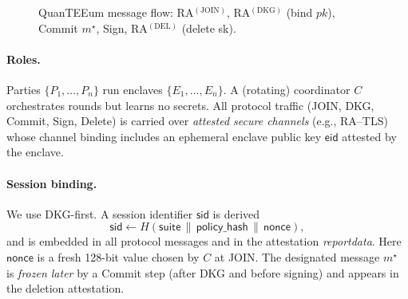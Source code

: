\documentclass[runningheads,orivec]{llncs}
\newcommand{\RA}{\mathsf{RA}}
\begin{document}
\begin{figure}[!htbp]
\caption{QuanTEEum message flow: RA$^{(\mathrm{JOIN})}$, RA$^{(\mathrm{DKG})}$ (bind $pk$), Commit $m^{\star}$, Sign, RA$^{(\mathrm{DEL})}$ (delete sk).}
\label{fig:flow}
\end{figure}

\paragraph{Roles.}
Parties $\{P_1,\dots,P_n\}$ run enclaves $\{E_1,\dots,E_n\}$.
A (rotating) coordinator $C$ orchestrates rounds but learns no secrets.
All protocol traffic (JOIN, DKG, Commit, Sign, Delete) is carried over
\emph{attested secure channels} (e.g., RA--TLS) whose channel binding includes an
ephemeral enclave public key $\mathsf{eid}$ attested by the enclave.

\paragraph{Session binding.}
We use DKG-first. A session identifier $\mathsf{sid}$ is derived
\[
  \mathsf{sid} \gets H(\mathsf{suite}\,\|\,\mathsf{policy\_hash}\,\|\,\mathsf{nonce}),
\]
and is embedded in all protocol messages and in the attestation \emph{reportdata}.
Here $\mathsf{nonce}$ is a fresh 128-bit value chosen by $C$ at JOIN.
The designated message $m^{\star}$ is \emph{frozen later} by a Commit step
(after DKG and before signing) and appears in the deletion attestation.
\end{document}
